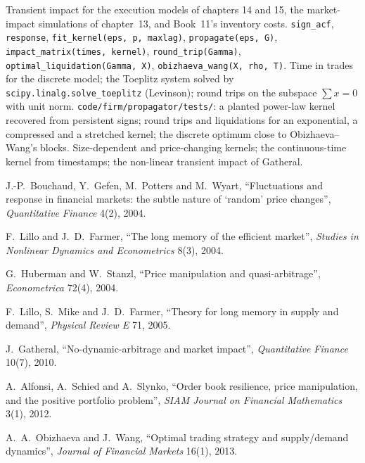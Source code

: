 \begin{build}
 Transient impact for the execution models of chapters 14 and 15, the market-impact simulations of chapter~13, and Book~11's inventory
costs.
 \texttt{sign\_acf}, \texttt{response}, \texttt{fit\_kernel(eps, p, maxlag)}, \texttt{propagate(eps, G)}, \texttt{impact\_matrix(times,
kernel)}, \texttt{round\_trip(Gamma)}, \texttt{optimal\_liquidation(Gamma, X)}, \texttt{obizhaeva\_wang(X, rho, T)}.
 Time in trades for the discrete model; the Toeplitz system solved by \texttt{scipy.linalg.solve\_toeplitz} (Levinson); round trips on the
subspace $\sum x=0$ with unit norm.
 \texttt{code/firm/propagator/tests/}: a planted power-law kernel recovered from persistent signs; round trips and liquidations
for an exponential, a compressed and a stretched kernel; the discrete optimum close to Obizhaeva--Wang's blocks.
 Size-dependent and price-changing kernels; the continuous-time kernel from timestamps; the non-linear transient impact of Gatheral.
\end{build}

\begin{omsources}
\item J.-P.~Bouchaud, Y.~Gefen, M.~Potters and M.~Wyart, ``Fluctuations and response in financial markets: the subtle nature of `random' price changes'',
\emph{Quantitative Finance} 4(2), 2004.
\item F.~Lillo and J.~D.~Farmer, ``The long memory of the efficient market'', \emph{Studies in Nonlinear Dynamics and Econometrics} 8(3), 2004.
\item G.~Huberman and W.~Stanzl, ``Price manipulation and quasi-arbitrage'', \emph{Econometrica} 72(4), 2004.
\item F.~Lillo, S.~Mike and J.~D.~Farmer, ``Theory for long memory in supply and demand'', \emph{Physical Review E} 71, 2005.
\item J.~Gatheral, ``No-dynamic-arbitrage and market impact'', \emph{Quantitative Finance} 10(7), 2010.
\item A.~Alfonsi, A.~Schied and A.~Slynko, ``Order book resilience, price manipulation, and the positive portfolio problem'', \emph{SIAM Journal on Financial
Mathematics} 3(1), 2012.
\item A.~A.~Obizhaeva and J.~Wang, ``Optimal trading strategy and supply/demand dynamics'', \emph{Journal of Financial Markets} 16(1), 2013.
\end{omsources}

